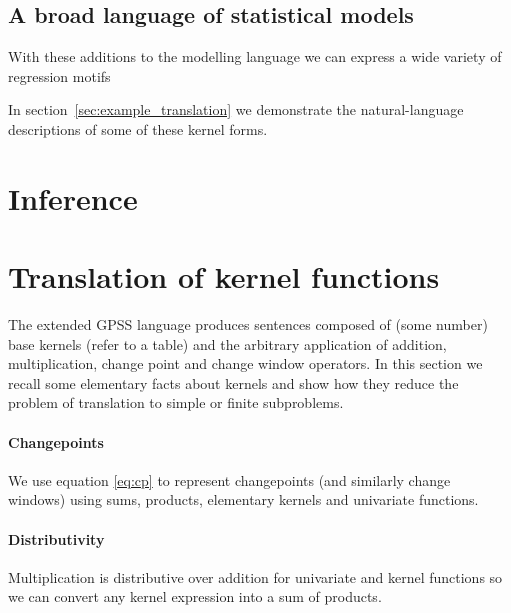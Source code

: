 \documentclass{article}
\begin{document}
\subsection{A broad language of statistical models}

With these additions to the modelling language we can express a wide variety of regression motifs


In section~\ref{sec:example_translation} we demonstrate the natural-language descriptions of some of these kernel forms.

\section{Inference}


\section{Translation of kernel functions}
\label{sec:translation}

The extended GPSS language produces sentences composed of (some number) base kernels (refer to a table) and the arbitrary application of addition, multiplication, change point and change window operators. 
In this section we recall some elementary facts about kernels and show how they reduce the problem of translation to simple or finite subproblems.

\paragraph{Changepoints}

We use equation \eqref{eq:cp} to represent changepoints (and similarly change windows) using sums, products, elementary kernels and univariate functions.

\paragraph{Distributivity}

Multiplication is distributive over addition for univariate and kernel functions so we can convert any kernel expression into a sum of products.
\end{document}
